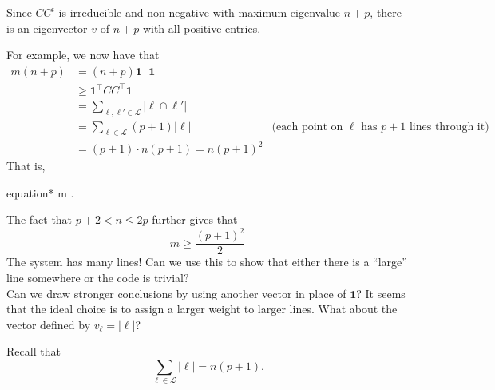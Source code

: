 \documentclass{article}
\begin{document}
		Since $CC^t$ is irreducible and non-negative with maximum eigenvalue $n+p$, there is an eigenvector $v$ of $n+p$ with all positive entries.

		For example, we now have that
		\begin{align*}
			m(n+p) &= (n+p)\textbf{1}^\top \textbf{1} \\
				&\ge \textbf{1}^\top CC^\top \textbf{1} \\
				&= \sum_{\ell,\ell' \in \mathcal{L}} |\ell \cap \ell'| \\
				&= \sum_{\ell \in \mathcal{L}} (p+1)|\ell| & \text{(each point on $\ell$ has $p+1$ lines through it)} \\ 
				&= (p+1) \cdot n(p+1) = n(p+1)^2
		\end{align*}
		That is,
		\begin{empheq}[box={\mybluebox[2pt][2pt]}]{equation*}
		    m \ge {}.
		\end{empheq}
		The fact that $p+2 < n \le 2p$ further gives that
		\[ m \ge \frac{(p+1)^2}{2} \]
		The system has many lines! Can we use this to show that either there is a ``large'' line somewhere or the code is trivial?\\
		Can we draw stronger conclusions by using another vector in place of $\textbf{1}$? It seems that the ideal choice is to assign a larger weight to larger lines. What about the vector defined by $v_{\ell} = |\ell|$?

		Recall that
		\[ \sum_{\ell \in \mathcal{L}} |\ell| = n(p+1). \]
\end{document}
